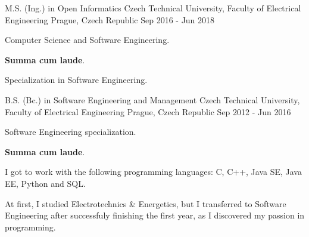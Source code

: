 \begin{cventries}
  \cventry
    {M.S. (Ing.) in Open Informatics}
    {Czech Technical University, Faculty of Electrical Engineering}
    {Prague, Czech Republic}
    {Sep 2016 - Jun 2018}
    {
      \begin{cvitems}
        \item {Computer Science and Software Engineering.}
        \item {\textbf{Summa cum laude}.}
        \item {Specialization in Software Engineering.}
      \end{cvitems}
    }

  \cventry
    {B.S. (Bc.) in Software Engineering and Management}
    {Czech Technical University, Faculty of Electrical Engineering}
    {Prague, Czech Republic}
    {Sep 2012 - Jun 2016}
    {
      \begin{cvitems}
        \item {Software Engineering specialization.}
        \item {\textbf{Summa cum laude}.}
        \item {I got to work with the following programming languages: C, C++, Java SE, Java EE, Python and SQL.}
        \item {At first, I studied Electrotechnics \& Energetics, but I transferred to Software Engineering after successfuly finishing the first year, as I discovered my passion in programming.}
      \end{cvitems}
    }
\end{cventries}
